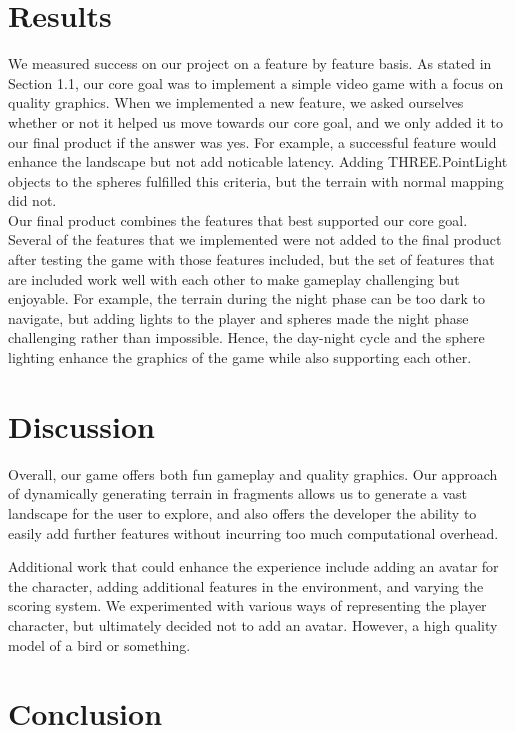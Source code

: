 \documentclass{article}
\begin{document}
\section{Results}
We measured success on our project on a feature by feature basis.  As stated in Section 1.1, our core goal was to implement a simple video game with a focus on quality graphics.  When we implemented a new feature, we asked ourselves whether or not it helped us move towards our core goal, and we only added it to our final product if the answer was yes.  For example, a successful feature would enhance the landscape but not add noticable latency. Adding THREE.PointLight objects to the spheres fulfilled this criteria, but the terrain with normal mapping did not.\\

Our final product combines the features that best supported our core goal.  Several of the features that we implemented were not added to the final product after testing the game with those features included, but the set of features that are included work well with each other to make gameplay challenging but enjoyable. For example, the terrain during the night phase can be too dark to navigate, but adding lights to the player and spheres made the night phase challenging rather than impossible.  Hence, the day-night cycle and the sphere lighting enhance the graphics of the game while also supporting each other.

%

\section{Discussion}
Overall, our game offers both fun gameplay and quality graphics. Our approach of dynamically generating terrain in fragments allows us to generate a vast landscape for the user to explore, and also offers the developer the ability to easily add further features without incurring too much computational overhead.

Additional work that could enhance the experience include adding an avatar for the character, adding additional features in the environment, and varying the scoring system. We experimented with various ways of representing the player character, but ultimately decided not to add an avatar. However, a high quality model of a bird or something.


\section{Conclusion}
\end{document}
